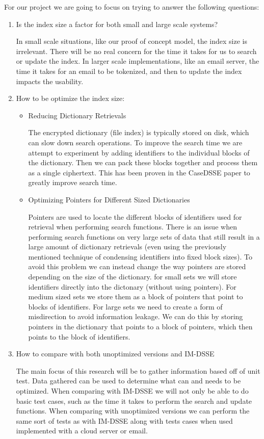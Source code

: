 \documentclass[onecolumn, draftclsnofoot,10pt, compsoc]{IEEEtran}
\begin{document}
For our project we are going to focus on trying to answer the following questions:

\begin{enumerate}
	\item Is the index size a factor for both small and large scale systems? 

In small scale situations, like our proof of concept model, the index size is irrelevant.
There will be no real concern for the time it takes for us to search or update the index.
In larger scale implementations, like an email server, the time it takes for an email to be tokenized, and then to update the index impacts the usability.
    
	\item How to be optimize the index size:
    \begin{itemize}
		\item Reducing Dictionary Retrievals
   
The encrypted dictionary (file index) is typically stored on disk, which can slow down search operations. To improve the search time we are attempt to experiment by adding identifiers to the individual blocks of the dictionary. Then we can pack these blocks together and process them as a single ciphertext. This has been proven in the Case\-DSSE paper to greatly improve search time.  

		\item Optimizing Pointers for Different Sized Dictionaries
        
Pointers are used to locate the different blocks of identifiers used for retrieval when performing search functions. There is an issue when performing search functions on very large sets of data that still result in a large amount of dictionary retrievals (even using the previously mentioned technique of condensing identifiers into fixed block sizes). To avoid this problem we can instead change the way pointers are stored depending on the size of the dictionary. for small sets we will store identifiers directly into the dictonary (without using pointers). For medium sized sets we store them as a block of pointers that point to blocks of identifiers. For large sets we need to create a form of misdirection to avoid information leakage. We can do this by storing pointers in the dictionary that points to a block of pointers, which then points to the block of identifiers.  

    \end{itemize}

  	\item How to compare with both unoptimized versions and IM-DSSE

	The main focus of this research will be to gather information based off of unit test.
    Data gathered can be used to determine what can and needs to be optimized.
    When comparing with IM-DSSE we will not only be able to do basic test cases, such as the time it takes to perform the search and update functions.
    When comparing with unoptimized versions we can perform the same sort of tests as with IM-DSSE along with tests cases when used implemented with a cloud server or email. 
\end{enumerate}
\end{document}
